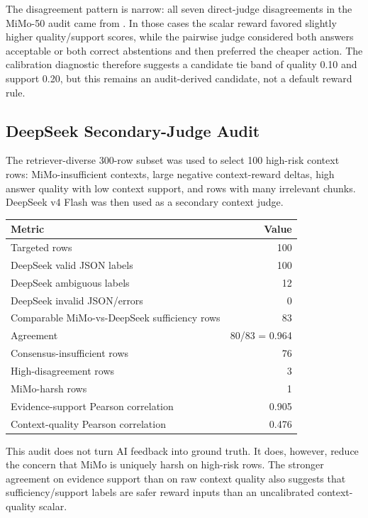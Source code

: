 The disagreement pattern is narrow: all seven direct-judge disagreements in the MiMo-50 audit came from . In those cases the scalar reward favored slightly higher quality/support scores, while the pairwise judge considered both answers acceptable or both correct abstentions and then preferred the cheaper action. The calibration diagnostic therefore suggests a candidate tie band of quality 0.10 and support 0.20, but this remains an audit-derived candidate, not a default reward rule.

\subsection{DeepSeek Secondary-Judge Audit}

The retriever-diverse 300-row subset was used to select 100 high-risk context rows: MiMo-insufficient contexts, large negative context-reward deltas, high answer quality with low context support, and rows with many irrelevant chunks. DeepSeek v4 Flash was then used as a secondary context judge.

\begin{center}
\small
\begin{tabular}{l r}
\toprule
Metric & Value \\
\midrule
Targeted rows & 100 \\
DeepSeek valid JSON labels & 100 \\
DeepSeek ambiguous labels & 12 \\
DeepSeek invalid JSON/errors & 0 \\
Comparable MiMo-vs-DeepSeek sufficiency rows & 83 \\
Agreement & 80/83 = 0.964 \\
Consensus-insufficient rows & 76 \\
High-disagreement rows & 3 \\
MiMo-harsh rows & 1 \\
Evidence-support Pearson correlation & 0.905 \\
Context-quality Pearson correlation & 0.476 \\
\bottomrule
\end{tabular}
\end{center}

This audit does not turn AI feedback into ground truth. It does, however, reduce the concern that MiMo is uniquely harsh on high-risk rows. The stronger agreement on evidence support than on raw context quality also suggests that sufficiency/support labels are safer reward inputs than an uncalibrated context-quality scalar.

